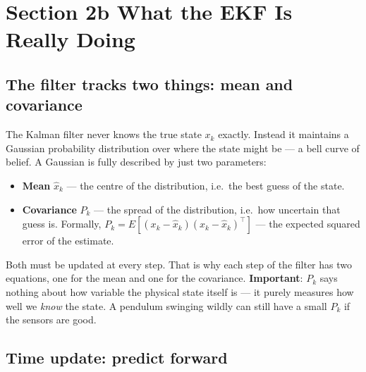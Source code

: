 \documentclass[12pt, a4paper]{article}
\begin{document}
\section*{Section 2b \quad What the EKF Is Really Doing}

\subsection*{The filter tracks two things: mean and covariance}

The Kalman filter never knows the true state $x_k$ exactly.
Instead it maintains a Gaussian probability distribution over where
the state might be --- a bell curve of belief.
A Gaussian is fully described by just two parameters:

\begin{itemize}[leftmargin=1.4em, topsep=2pt]
  \item \textbf{Mean} $\hat{x}_k$ --- the centre of the distribution,
        i.e.\ the best guess of the state.
  \item \textbf{Covariance} $P_k$ --- the spread of the distribution,
        i.e.\ how uncertain that guess is.
        Formally, $P_k = E[(x_k - \hat{x}_k)(x_k - \hat{x}_k)^\top]$
        --- the expected squared error of the estimate.
\end{itemize}

Both must be updated at every step. That is why each step of the
filter has two equations, one for the mean and one for the
covariance. \textbf{Important}: $P_k$ says nothing about how
variable the physical state itself is --- it purely measures how well
we \emph{know} the state. A pendulum swinging wildly can still have
a small $P_k$ if the sensors are good.

\subsection*{Time update: predict forward}
\end{document}
